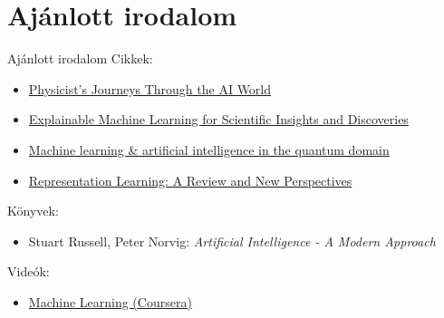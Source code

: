 \section{Ajánlott irodalom}

\begin{frame}{Ajánlott irodalom}
    Cikkek:
    \begin{itemize}
        \item \href{https://arxiv.org/pdf/1905.01023.pdf}{Physicist's Journeys Through the AI World}
        \item \href{https://arxiv.org/pdf/1905.08883.pdf}{Explainable Machine Learning for Scientific Insights and Discoveries}
        \item \href{https://arxiv.org/pdf/1709.02779.pdf}{Machine learning \& artificial intelligence in the quantum domain}
        \item \href{https://arxiv.org/pdf/1206.5538.pdf}{Representation Learning: A Review and New Perspectives}
    \end{itemize}
    Könyvek:
    \begin{itemize}
        \item Stuart Russell, Peter Norvig: {\it Artificial Intelligence - A Modern Approach}
    \end{itemize}
    
    Videók:
    \begin{itemize}
        \item \href{https://www.coursera.org/learn/machine-learning}{Machine Learning (Coursera)}
    \end{itemize}
\end{frame}
